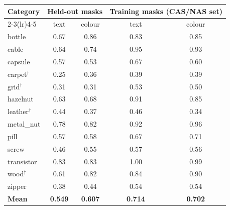 \begin{tabular}{@{}l c c c c@{}}
\toprule
Category & \multicolumn{2}{c}{Held-out masks} & \multicolumn{2}{c}{Training masks (CAS/NAS set)} \\
\cmidrule(lr){2-3}\cmidrule(lr){4-5}
 & text & colour & text & colour \\
\midrule
bottle & 0.67 & 0.86 & 0.83 & 0.85 \\
cable & 0.64 & 0.74 & 0.95 & 0.93 \\
capsule & 0.57 & 0.53 & 0.67 & 0.60 \\
carpet$^\dagger$ & 0.25 & 0.36 & 0.39 & 0.39 \\
grid$^\dagger$ & 0.31 & 0.31 & 0.53 & 0.50 \\
hazelnut & 0.63 & 0.68 & 0.91 & 0.85 \\
leather$^\dagger$ & 0.44 & 0.37 & 0.46 & 0.34 \\
metal\_nut & 0.78 & 0.82 & 0.92 & 0.96 \\
pill & 0.57 & 0.58 & 0.67 & 0.71 \\
screw & 0.46 & 0.55 & 0.57 & 0.56 \\
transistor & 0.83 & 0.83 & 1.00 & 0.99 \\
wood$^\dagger$ & 0.61 & 0.82 & 0.84 & 0.90 \\
zipper & 0.38 & 0.44 & 0.54 & 0.54 \\
\midrule
\textbf{Mean} & \textbf{0.549} & \textbf{0.607} & \textbf{0.714} & \textbf{0.702} \\
\bottomrule
\end{tabular}
